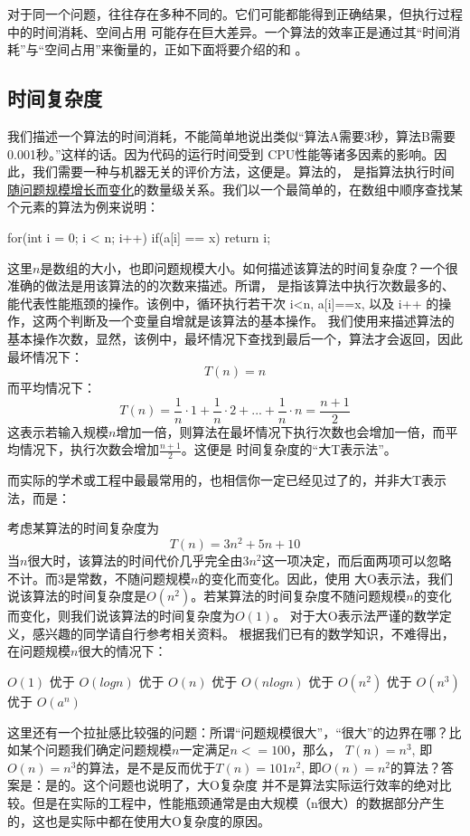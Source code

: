 对于同一个问题，往往存在多种不同的。它们可能都能得到正确结果，但执行过程中的时间消耗、空间占用
可能存在巨大差异。一个算法的效率正是通过其“时间消耗”与“空间占用”来衡量的，正如下面将要介绍的和
。

\subsection{时间复杂度}
我们描述一个算法的时间消耗，不能简单地说出类似“算法A需要3秒，算法B需要0.001秒。”这样的话。因为代码的运行时间受到
CPU性能等诸多因素的影响。因此，我们需要一种与机器无关的评价方法，这便是。算法的，
是指算法执行时间\uline{随问题规模增长而变化}的数量级关系。我们以一个最简单的，在数组中顺序查找某个元素的算法为例来说明：
\begin{cppcode}
for(int i = 0; i < n; i++)
{
    if(a[i] == x)
        return i;
}
\end{cppcode}
这里\(n\)是数组的大小，也即问题规模大小。如何描述该算法的时间复杂度？一个很准确的做法是用该算法的的次数来描述。所谓，
是指该算法中执行次数最多的、能代表性能瓶颈的操作。该例中，循环执行若干次 i<n, a[i]==x, 以及 i++ 的操作，这两个判断及一个变量自增就是该算法的基本操作。
我们使用来描述算法的基本操作次数，显然，该例中，最坏情况下查找到最后一个，算法才会返回，因此最坏情况下：
\[
T(n)=n
\]
而平均情况下：
\[
T(n) = \frac{1}{n}\cdot 1 + \frac{1}{n}\cdot 2 + ... + \frac{1}{n}\cdot n = \frac{n+1}{2}
\]
这表示若输入规模\(n\)增加一倍，则算法在最坏情况下执行次数也会增加一倍，而平均情况下，执行次数会增加\(\frac{n+1}{2}\)。这便是
时间复杂度的“大T表示法”。

而实际的学术或工程中最最常用的，也相信你一定已经见过了的，并非大T表示法，而是：

考虑某算法的时间复杂度为
\[
T(n) = 3n^{2} + 5n + 10
\]
当\(n\)很大时，该算法的时间代价几乎完全由\(3n^2\)这一项决定，而后面两项可以忽略不计。而3是常数，不随问题规模\(n\)的变化而变化。因此，使用
大O表示法，我们说该算法的时间复杂度是\(O(n^2)\)。若某算法的时间复杂度不随问题规模\(n\)的变化而变化，则我们说该算法的时间复杂度为\(O(1)\)。
对于大O表示法严谨的数学定义，感兴趣的同学请自行参考相关资料。
根据我们已有的数学知识，不难得出，在问题规模\(n\)很大的情况下：
\begin{bulk}
    \(O(1)\) 优于 \(O(logn)\) 优于 \(O(n)\) 优于 \(O(nlogn)\) 优于 \(O(n^2)\) 优于 \(O(n^3)\) 优于 \(O(a^n)\)
\end{bulk}
\begin{insightbox}
这里还有一个拉扯感比较强的问题：所谓“问题规模很大”，“很大”的边界在哪？比如某个问题我们确定问题规模\(n\)一定满足\(n<=100\)，那么，
\(T(n) = n^3\), 即\(O(n) = n^3\)的算法，是不是反而优于\(T(n) = 101n^2\), 即\(O(n) = n^2\)的算法？答案是：是的。这个问题也说明了，大O复杂度
并不是算法实际运行效率的绝对比较。但是在实际的工程中，性能瓶颈通常是由大规模（n很大）的数据部分产生的，这也是实际中都在使用大O复杂度的原因。
\end{insightbox}

